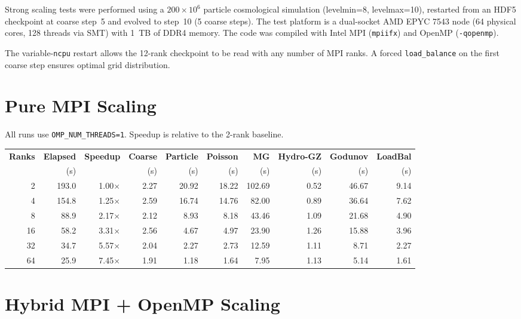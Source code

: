\documentclass[11pt,fleqn]{book}
\begin{document}
Strong scaling tests were performed using a $200 \times 10^6$ particle cosmological simulation (levelmin=8, levelmax=10), restarted from an HDF5 checkpoint at coarse step~5 and evolved to step~10 (5 coarse steps). The test platform is a dual-socket AMD EPYC 7543 node (64 physical cores, 128 threads via SMT) with 1~TB of DDR4 memory. The code was compiled with Intel MPI (\texttt{mpiifx}) and OpenMP (\texttt{-qopenmp}).

The variable-\texttt{ncpu} restart allows the 12-rank checkpoint to be read with any number of MPI ranks. A forced \texttt{load\_balance} on the first coarse step ensures optimal grid distribution.

\section{Pure MPI Scaling}

All runs use \texttt{OMP\_NUM\_THREADS=1}.  Speedup is relative to the 2-rank baseline.

\begin{center}
\begin{tabular}{rrrrrrrrrr}
\toprule
\textbf{Ranks} & \textbf{Elapsed} & \textbf{Speedup} & \textbf{Coarse} & \textbf{Particle} & \textbf{Poisson} & \textbf{MG} & \textbf{Hydro-GZ} & \textbf{Godunov} & \textbf{LoadBal} \\
 & (s) & & (s) & (s) & (s) & (s) & (s) & (s) & (s) \\
\midrule
2   & 193.0 & 1.00$\times$ & 2.27 & 20.92 & 18.22 & 102.69 & 0.52 & 46.67 & 9.14 \\
4   & 154.8 & 1.25$\times$ & 2.59 & 16.74 & 14.76 & 82.00  & 0.89 & 36.64 & 7.62 \\
8   &  88.9 & 2.17$\times$ & 2.12 &  8.93 &  8.18 & 43.46  & 1.09 & 21.68 & 4.90 \\
16  &  58.2 & 3.31$\times$ & 2.56 &  4.67 &  4.97 & 23.90  & 1.26 & 15.88 & 3.96 \\
32  &  34.7 & 5.57$\times$ & 2.04 &  2.27 &  2.73 & 12.59  & 1.11 &  8.71 & 2.27 \\
64  &  25.9 & 7.45$\times$ & 1.91 &  1.18 &  1.64 &  7.95  & 1.13 &  5.14 & 1.61 \\
\bottomrule
\end{tabular}
\end{center}

\section{Hybrid MPI + OpenMP Scaling}
\end{document}
